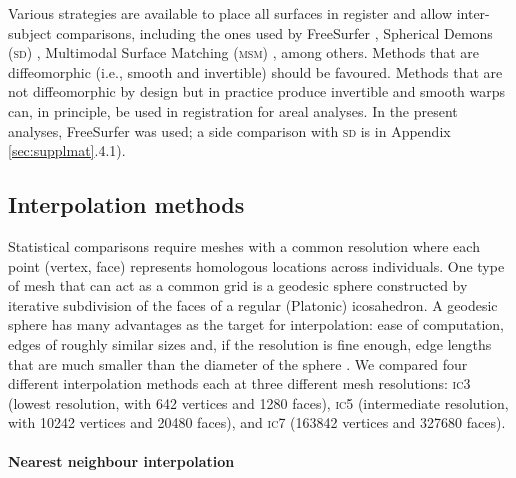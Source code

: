 Various strategies are available to place all surfaces in register and allow inter-subject comparisons, including the ones used by FreeSurfer \citep{Fischl1999_intersubject}, Spherical Demons (\textsc{sd}) \citep{Yeo2010}, Multimodal Surface Matching (\textsc{msm}) \citep{Robinson2014}, among others. Methods that are diffeomorphic (i.e., smooth and invertible) should be favoured. Methods that are not diffeomorphic by design but in practice produce invertible and smooth warps can, in principle, be used in registration for areal analyses. In the present analyses, FreeSurfer was used; a side comparison with \textsc{sd} is in Appendix \ref{sec:supplmat}.4.1).

\subsection{Interpolation methods}
\label{sec:cortex:interpolation}

Statistical comparisons require meshes with a common resolution where each point (vertex, face) represents homologous locations across individuals. One type of mesh that can act as a common grid is a geodesic sphere constructed by iterative subdivision of the faces of a regular (Platonic) icosahedron. A geodesic sphere has many advantages as the target for interpolation: ease of computation, edges of roughly similar sizes and, if the resolution is fine enough, edge lengths that are much smaller than the diameter of the sphere \citep{Kenner1976}. We compared four different interpolation methods each at three different mesh resolutions: \textsc{ic}3 (lowest resolution, with 642 vertices and 1280 faces), \textsc{ic}5 (intermediate resolution, with 10242 vertices and 20480 faces),  and \textsc{ic}7 (163842 vertices and 327680 faces).

\paragraph{Nearest neighbour interpolation}

